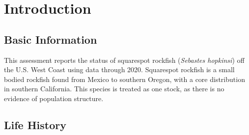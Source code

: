 \documentclass[11pt,
  english,
  a4paper,
]{article}
\begin{document}
\newcommand{\lt}{\ensuremath <}
\newcommand{\gt}{\ensuremath >}

\newlength{\cslhangindent}
\setlength{\cslhangindent}{1.5em}
\newenvironment{cslreferences}%
  {\setlength{\parindent}{0pt}%
  \everypar{\setlength{\hangindent}{\cslhangindent}}\ignorespaces}%
  {\par}

\pagebreak
{}
\setcounter{page}{1}

\pagebreak
\setlength{\parskip}{5mm plus1mm minus1mm}
\setcounter{page}{1}
\renewcommand{\thefigure}{\arabic{figure}}
\renewcommand{\thetable}{\arabic{table}}
\setcounter{table}{0}
\setcounter{figure}{0}

\setlength\parskip{0.5em plus 0.1em minus 0.2em}


\hypertarget{introduction}{%
\section{Introduction}\label{introduction}}

\leavevmode\tagmcend\tagstructend


\hypertarget{basic-information}{%
\subsection{Basic Information}\label{basic-information}}

\leavevmode\tagmcend\tagstructend


This assessment reports the status of squarespot rockfish (\emph{Sebastes hopkinsi}) off the U.S. West Coast using data through 2020. Squarespot rockfish is a small bodied rockfish found from Mexico to southern Oregon, with a core distribution in southern California. This species is treated as one stock, as there is no evidence of population structure.

\leavevmode\tagmcend\tagstructend\par


\hypertarget{life-history}{%
\subsection{Life History}\label{life-history}}
\end{document}
